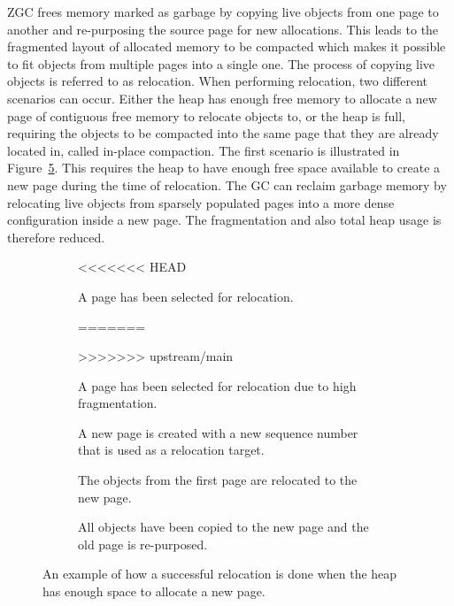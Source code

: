 \vspace*{-0.49cm}

ZGC frees memory marked as garbage by copying live objects from one page to another and re-purposing the source page for new allocations. This leads to the fragmented layout of allocated memory to be compacted which makes it possible to fit objects from multiple pages into a single one. The process of copying live objects is referred to as relocation. When performing relocation, two different scenarios can occur. Either the heap has enough free memory to allocate a new page of contiguous free memory to relocate objects to, or the heap is full, requiring the objects to be compacted into the same page that they are already located in, called in-place compaction. The first scenario is illustrated in Figure~\ref{fig:zrel_new}. This requires the heap to have enough free space available to create a new page during the time of relocation. The GC can reclaim garbage memory by relocating live objects from sparsely populated pages into a more dense configuration inside a new page. The fragmentation and also total heap usage is therefore reduced.

\begin{figure}[H]
    \centering
    \begin{subfigure}[t]{.2\textwidth}
        \centering
<<<<<<< HEAD
        
        \caption{A page has been selected for relocation.}
=======
        
        \caption{A page has been selected for relocation due to high fragmentation.}
>>>>>>> upstream/main
        \label{fig:zrel_new1}
    \end{subfigure}
    \hfill\vline\hfill
    \begin{subfigure}[t]{.2\textwidth}
        \centering
        
        \caption{A new page is created with a new sequence number that is used as a relocation target.}
        \label{fig:zrel_new2}
    \end{subfigure}
    \hfill\vline\hfill
    \begin{subfigure}[t]{.2\textwidth}
        \centering
        
        \caption{The objects from the first page are relocated to the new page.}
        \label{fig:zrel_new3}
    \end{subfigure}
    \hfill\vline\hfill
    \begin{subfigure}[t]{.2\textwidth}
        \centering
        
        \caption{All objects have been copied to the new page and the old page is re-purposed.}
        \label{fig:zrel_new3}
    \end{subfigure}
    \caption{An example of how a successful relocation is done when the heap has enough space to allocate a new page.}
    \label{fig:zrel_new}
\end{figure}

